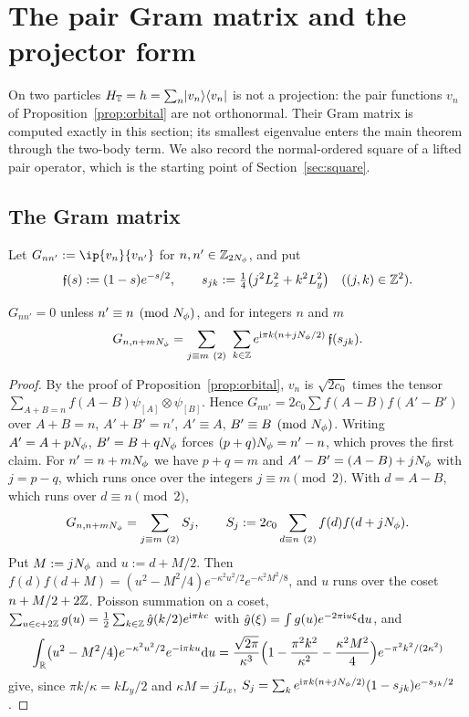 \section{The pair Gram matrix and the projector form}\label{sec:projector}

On two particles $H_{\mathbb{T}}=h=\sum_n\lvert v_n\rangle\langle v_n\rvert$ is not a projection: the pair functions $v_n$ of
Proposition~\ref{prop:orbital} are not orthonormal. Their Gram matrix is computed exactly in this section; its
smallest eigenvalue enters the main theorem through the two-body term. We also record the normal-ordered square of a
lifted pair operator, which is the starting point of Section~\ref{sec:square}.

\subsection{The Gram matrix}

Let $G_{nn'}:=\ip{v_n}{v_{n'}}$ for $n,n'\in\mathbb{Z}_{2N_{\phi}}$, and put
\[
\mathfrak f(s):=(1-s)e^{-s/2},\qquad s_{jk}:=\tfrac14\bigl(j^2L_x^2+k^2L_y^2\bigr)\quad((j,k)\in\mathbb{Z}^2).
\]

\begin{lemma}\label{lem:gram}
$G_{nn'}=0$ unless $n'\equiv n\pmod{N_{\phi}}$, and for integers $n$ and $m$
\begin{equation}\label{eq:gram}
G_{n,n+mN_{\phi}}=\sum_{j\equiv m\ (2)}\ \sum_{k\in\mathbb{Z}}e^{\mathrm{i}\pi k(n+jN_{\phi}/2)}\,\mathfrak f(s_{jk}).
\end{equation}
\end{lemma}

\begin{proof}
By the proof of Proposition~\ref{prop:orbital}, $v_n$ is $\sqrt{2c_0}$ times the tensor $\sum_{A+B=n}f(A-B)\psi_{[A]}\otimes\psi_{[B]}$.
Hence $G_{nn'}=2c_0\sum f(A-B)f(A'-B')$ over $A+B=n$, $A'+B'=n'$, $A'\equiv A$, $B'\equiv B\pmod{N_{\phi}}$. Writing
$A'=A+pN_{\phi}$, $B'=B+qN_{\phi}$ forces $(p+q)N_{\phi}=n'-n$, which proves the first claim. For $n'=n+mN_{\phi}$ we have $p+q=m$ and
$A'-B'=(A-B)+jN_{\phi}$ with $j=p-q$, which runs once over the integers $j\equiv m\pmod2$. With $d=A-B$, which runs over
$d\equiv n\pmod 2$,
\[
G_{n,n+m\Nphi}=\sum_{j\equiv m\ (2)}S_j,\qquad S_j:=2c_0\sum_{d\equiv n\ (2)}f(d)f(d+j\Nphi).
\]
Put $M:=jN_{\phi}$ and $u:=d+M/2$. Then $f(d)f(d+M)=(u^2-M^2/4)e^{-\kappa^2u^2/2}e^{-\kappa^2M^2/8}$, and $u$ runs over the coset
$n+M/2+2\mathbb{Z}$. Poisson summation on a coset, $\sum_{u\in c+2\mathbb{Z}}g(u)=\frac12\sum_{k\in\mathbb{Z}}\hat g(k/2)e^{\mathrm{i}\pi kc}$ with
$\hat g(\xi)=\int g(u)e^{-2\pi\mathrm{i} u\xi}\mathrm{d} u$, and
\[
\int_{\mathbb{R}}\bigl(u^2-M^2/4\bigr)e^{-\kappa^2u^2/2}e^{-\mathrm{i}\pi ku}\mathrm{d} u=\frac{\sqrt{2\pi}}{\kappa^3}\Bigl(1-\frac{\pi^2k^2}{\kappa^2}-\frac{\kappa^2M^2}4\Bigr)e^{-\pi^2k^2/(2\kappa^2)}
\]
give, since $\pi k/\kappa=kL_y/2$ and $\kappa M=jL_x$,
$S_j=\sum_ke^{\mathrm{i}\pi k(n+jN_{\phi}/2)}(1-s_{jk})e^{-s_{jk}/2}$.
\end{proof}

